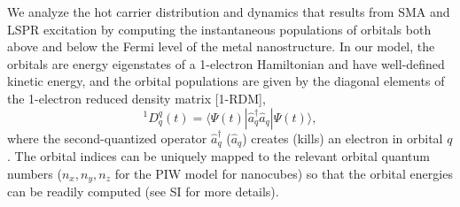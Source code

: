 \documentclass[journal=jpclcd,manuscript=article]{achemso}
\begin{document}
We analyze the hot carrier distribution and dynamics that results from SMA and LSPR excitation by computing the 
instantaneous populations of orbitals both above and below the Fermi level of the metal nanostructure.   
In our model, the orbitals are energy eigenstates of a 1-electron Hamiltonian and have well-defined kinetic energy,
and the orbital populations are given by the diagonal elements of the 1-electron reduced density matrix [1-RDM],
\begin{equation}
^1D^q_q(t) = \langle \Psi(t) | \hat{a}^{\dagger}_q \hat{a}_q | \Psi(t) \rangle,
\end{equation} 
where the second-quantized operator $\hat{a}_q^{\dagger}$ ($\hat{a}_q$) creates (kills) an electron
in orbital $q$.  The orbital indices can be uniquely mapped to the relevant orbital quantum numbers ($n_x, n_y, n_z$ for
the PIW model for nanocubes) so that the orbital energies can be readily computed (see SI for more details). 
\end{document}
